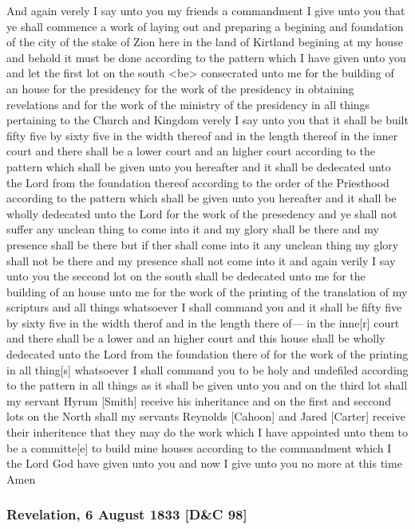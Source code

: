 				And again verely I say unto you my friends a commandment I give unto you that ye shall commence a work of laying out and preparing a begining and foundation of the city of the stake of Zion here in the land of Kirtland begining at my house and behold it must be done according to the pattern which I have given unto you and let the first lot on the south <be> consecrated unto me for the building of an house for the presidency for the work of the presidency in obtaining revelations and for the work of the ministry of the presidency in all things pertaining to the Church and Kingdom verely I say unto you that it shall be built fifty five by sixty five in the width thereof and in the length thereof in the inner court and there shall be a lower court and an higher court according to the pattern which shall be given unto you hereafter and it shall be dedecated unto the Lord from the foundation thereof according to the order of the Priesthood according to the pattern which shall be given unto you hereafter and it shall be wholly dedecated unto the Lord for the work of the presedency and ye shall not suffer any unclean thing to come into it and my glory shall be there and my presence shall be there but if ther shall come into it any unclean thing my glory shall not be there and my presence shall not come into it and again verily I say unto you the seccond lot on the south shall be dedecated unto me for the building of an house unto me for the work of the printing of the translation of my scripturs and all things whatsoever I shall command you and it shall be fifty five by sixty five in the width therof and in the length there of--- in the inne[r] court and there shall be a lower and an higher court and this house shall be wholly dedecated unto the Lord from the foundation there of for the work of the printing in all thing[s] whatsoever I shall command you to be holy and undefiled according to the pattern in all things as it shall be given unto you and on the third lot shall my servant Hyrum [Smith] receive his inheritance and on the first and seccond lots on the North shall my servants Reynolds [Cahoon] and Jared [Carter] receive their inheritence that they may do the work which I have appointed unto them to be a committe[e] to build mine houses according to the commandment which I the Lord God have given unto you and now I give unto you no more at this time Amen
				
		\subsubsection{Revelation, 6 August 1833 [D\&C 98]}
			\label{EMS-1833-JS-6-AUG-1833}
		
